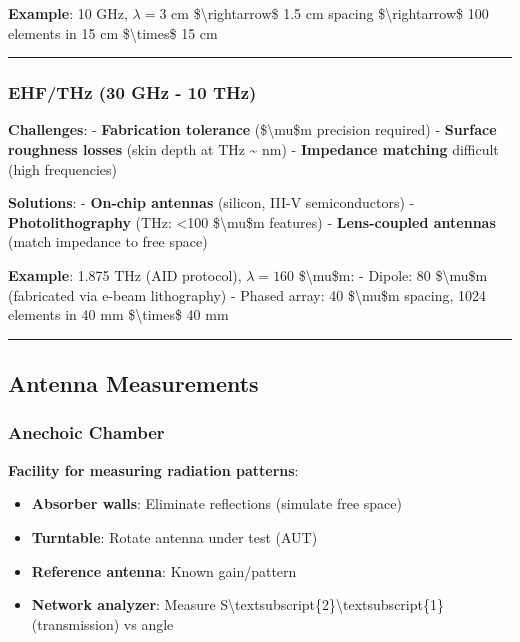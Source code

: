 \textbf{Example}: 10 GHz, \(\lambda = 3\) cm
\$\textbackslash rightarrow\$ 1.5 cm spacing
\$\textbackslash rightarrow\$ 100 elements in 15 cm
\$\textbackslash times\$ 15 cm

\begin{center}\rule{0.5\linewidth}{0.5pt}\end{center}

\subsubsection{EHF/THz (30 GHz - 10 THz)}\label{ehfthz-30-ghz---10-thz}

\textbf{Challenges}: - \textbf{Fabrication tolerance}
(\$\textbackslash mu\$m precision required) - \textbf{Surface roughness
losses} (skin depth at THz \textasciitilde{} nm) - \textbf{Impedance
matching} difficult (high frequencies)

\textbf{Solutions}: - \textbf{On-chip antennas} (silicon, III-V
semiconductors) - \textbf{Photolithography} (THz: \textless100
\$\textbackslash mu\$m features) - \textbf{Lens-coupled antennas} (match
impedance to free space)

\textbf{Example}: 1.875 THz (AID protocol), \(\lambda = 160\)
\$\textbackslash mu\$m: - Dipole: 80 \$\textbackslash mu\$m (fabricated
via e-beam lithography) - Phased array: 40 \$\textbackslash mu\$m
spacing, 1024 elements in 40 mm \$\textbackslash times\$ 40 mm

\begin{center}\rule{0.5\linewidth}{0.5pt}\end{center}

\subsection{Antenna Measurements}\label{antenna-measurements}

\subsubsection{Anechoic Chamber}\label{anechoic-chamber}

\textbf{Facility for measuring radiation patterns}:

\begin{itemize}
\tightlist
\item
  \textbf{Absorber walls}: Eliminate reflections (simulate free space)
\item
  \textbf{Turntable}: Rotate antenna under test (AUT)
\item
  \textbf{Reference antenna}: Known gain/pattern
\item
  \textbf{Network analyzer}: Measure
  S\textbackslash textsubscript\{2\}\textbackslash textsubscript\{1\}
  (transmission) vs angle
\end{itemize}


